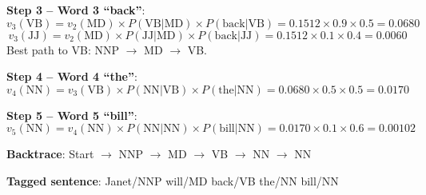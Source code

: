 \documentclass[11pt,a4paper]{article}
\begin{document}
\begin{tcolorbox}[colback=green!5!white,colframe=green!75!black,title=\textbf{Worked Example 24: Full Viterbi Walkthrough}]
\textbf{Step 3 -- Word 3 ``back''}:
\[
v_3(\text{VB}) = v_2(\text{MD}) \times P(\text{VB}|\text{MD}) \times P(\text{back}|\text{VB}) = 0.1512 \times 0.9 \times 0.5 = 0.0680
\]
\[
v_3(\text{JJ}) = v_2(\text{MD}) \times P(\text{JJ}|\text{MD}) \times P(\text{back}|\text{JJ}) = 0.1512 \times 0.1 \times 0.4 = 0.0060
\]
Best path to VB: NNP $\to$ MD $\to$ VB.

\textbf{Step 4 -- Word 4 ``the''}:
\[
v_4(\text{NN}) = v_3(\text{VB}) \times P(\text{NN}|\text{VB}) \times P(\text{the}|\text{NN}) = 0.0680 \times 0.5 \times 0.5 = 0.0170
\]

\textbf{Step 5 -- Word 5 ``bill''}:
\[
v_5(\text{NN}) = v_4(\text{NN}) \times P(\text{NN}|\text{NN}) \times P(\text{bill}|\text{NN}) = 0.0170 \times 0.1 \times 0.6 = 0.00102
\]

\textbf{Backtrace}: Start $\to$ NNP $\to$ MD $\to$ VB $\to$ NN $\to$ NN

\textbf{Tagged sentence}: Janet/NNP will/MD back/VB the/NN bill/NN
\end{tcolorbox}
\end{document}
